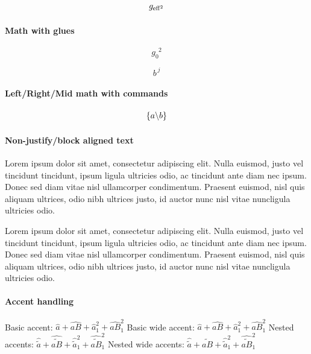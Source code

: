 \documentclass{article}
\begin{document}
\begin{eqnarray}
  g_{\rm eff^2}
\end{eqnarray}

\paragraph{Math with glues}
\begin{equation}
  g_0^{\phantom{0}2}
\end{equation}

$$b^{\,j}$$

\paragraph{Left/Right/Mid math with commands}

$$ \left\lbrace a \middle\backslash b \right\rbrace $$


\paragraph{Non-justify/block aligned text}

\begin{flushleft}
  Lorem ipsum dolor sit amet, consectetur adipiscing elit. Nulla euismod, justo vel tincidunt tincidunt, ipsum ligula ultricies odio,
  ac tincidunt ante diam nec ipsum. Donec sed diam vitae nisl ullamcorper condimentum. Praesent euismod, nisl quis aliquam ultrices, odio nibh ultrices justo, id auctor nunc nisl vitae nuncligula ultricies odio.  
\end{flushleft}

\begin{FlushLeft}
  Lorem ipsum dolor sit amet, consectetur adipiscing elit. Nulla euismod, justo vel tincidunt tincidunt, ipsum ligula ultricies odio,
  ac tincidunt ante diam nec ipsum. Donec sed diam vitae nisl ullamcorper condimentum. Praesent euismod, nisl quis aliquam ultrices, odio nibh ultrices justo, id auctor nunc nisl vitae nuncligula ultricies odio.  
\end{FlushLeft}

\paragraph{Accent handling}

Basic accent: $\hat{a} + \hat{aB} + \hat{a}_1^2 + \hat{aB}_1^2$
Basic wide accent: $\widehat{a} + \widehat{aB} + \widehat{a}_1^2 + \widehat{aB}_1^2$
Nested accents: $\hat{\tilde{a}} + \hat{\tilde{aB}} + \hat{\tilde{a}}_1^2 + \hat{\tilde{aB}}_1^2$
Nested wide accents: $\widehat{\widetilde{a}} + \widehat{\widetilde{aB}} + \widehat{\widetilde{a}}_1^2 + \widehat{\widetilde{aB}}_1^2$
\end{document}
